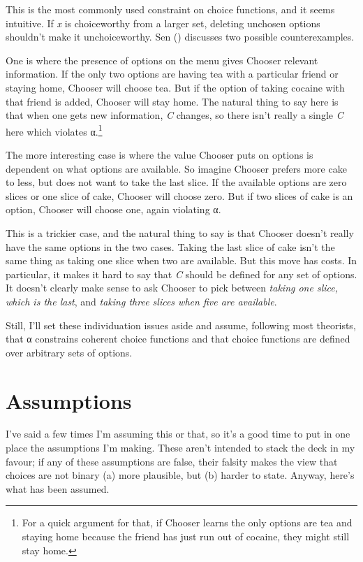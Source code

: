 \documentclass[
  11pt,
  letterpaper,
  DIV=11,
  numbers=noendperiod,
  twoside]{scrartcl}
\begin{document}
This is the most commonly used constraint on choice functions, and it
seems intuitive. If \emph{x} is choiceworthy from a larger set, deleting
unchosen options shouldn't make it unchoiceworthy. Sen
() discusses two
possible counterexamples.

One is where the presence of options on the menu gives Chooser relevant
information. If the only two options are having tea with a particular
friend or staying home, Chooser will choose tea. But if the option of
taking cocaine with that friend is added, Chooser will stay home. The
natural thing to say here is that when one gets new information,
\emph{C} changes, so there isn't really a single \emph{C} here which
violates α.\footnote{For a quick argument for that, if Chooser learns
  the only options are tea and staying home because the friend has just
  run out of cocaine, they might still stay home.}

The more interesting case is where the value Chooser puts on options is
dependent on what options are available. So imagine Chooser prefers more
cake to less, but does not want to take the last slice. If the available
options are zero slices or one slice of cake, Chooser will choose zero.
But if two slices of cake is an option, Chooser will choose one, again
violating α.

This is a trickier case, and the natural thing to say is that Chooser
doesn't really have the same options in the two cases. Taking the last
slice of cake isn't the same thing as taking one slice when two are
available. But this move has costs. In particular, it makes it hard to
say that \emph{C} should be defined for any set of options. It doesn't
clearly make sense to ask Chooser to pick between \emph{taking one
slice, which is the last}, and \emph{taking three slices when five are
available}.

Still, I'll set these individuation issues aside and assume, following
most theorists, that α constrains coherent choice functions and that
choice functions are defined over arbitrary sets of options.

\section{Assumptions}\label{sec-assumptions}

I've said a few times I'm assuming this or that, so it's a good time to
put in one place the assumptions I'm making. These aren't intended to
stack the deck in my favour; if any of these assumptions are false,
their falsity makes the view that choices are not binary (a) more
plausible, but (b) harder to state. Anyway, here's what has been
assumed.
\end{document}
